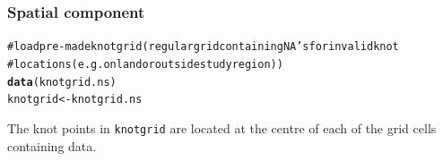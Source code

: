 \documentclass[11pt, a4paper]{article}
\makeatletter
\newcommand{\hlfunctioncall}[1]{\textcolor[rgb]{0.501960784313725,0,0.329411764705882}{\textbf{#1}}}%
\newcommand{\hlcomment}[1]{\textcolor[rgb]{0.180392156862745,0.6,0.341176470588235}{#1}}%
\newenvironment{kframe}{%
 \def\at@end@of@kframe{}%
 \ifinner\ifhmode%
  \def\at@end@of@kframe{\end{minipage}}%
  \begin{minipage}{\columnwidth}%
 \fi\fi%
 \def\FrameCommand##1{\hskip\@totalleftmargin \hskip-\fboxsep
 \colorbox{shadecolor}{##1}\hskip-\fboxsep
     \hskip-\linewidth \hskip-\@totalleftmargin \hskip\columnwidth}%
 \MakeFramed {\advance\hsize-\width
   \@totalleftmargin\z@ \linewidth\hsize
   \@setminipage}}%
 {\par\unskip\endMakeFramed%
 \at@end@of@kframe}
\newenvironment{knitrout}{}{} %
\makeatother
\begin{document}
\begin{frame}[fragile]
\frametitle{Spatial component}
\begin{knitrout}\footnotesize
{}\color{fgcolor}\begin{kframe}
\begin{alltt}
\hlcomment{# load pre-made knotgrid (regular grid containing NA's for invalid knot }
\hlcomment{# locations (e.g. on land or outside study region))}
\hlfunctioncall{data}(knotgrid.ns)
knotgrid <- knotgrid.ns
\end{alltt}
\end{kframe}
\end{knitrout}

\noindent The knot points in {\tt knotgrid} are located at the centre of each of the grid cells containing data.
\end{frame}
\end{document}
